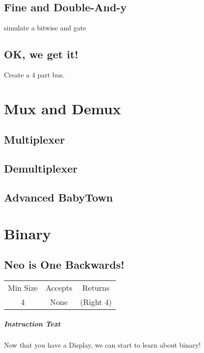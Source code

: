 \documentclass[a4paper, 12pt]{article}
\begin{document}
\subsection{Fine and Double-And-y}
simulate a bitwise and gate
\subsection{OK, we get it!}
Create a 4 part bus.
\section{Mux and Demux}

\subsection{Multiplexer}
\subsection{Demultiplexer}
\subsection{Advanced BabyTown}
\subsection{}
\section{Binary}
\subsection{Neo is One Backwards!}
\begin{tabular}{ccc}
	Min Size & Accepts & Returns \\ 
	4 & None & (Right 4)
\end{tabular}

\subparagraph{Instruction Text}
Now that you have a Display, we can start to learn about binary! 
\end{document}
